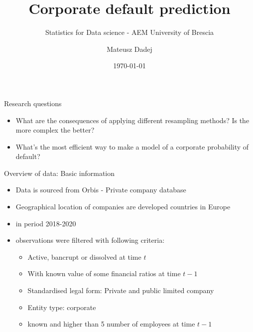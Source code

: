 \documentclass{beamer}
\title{Corporate default prediction}
\subtitle{Statistics for Data science - AEM University of Brescia}
\author{Mateusz Dadej}
\date{\today}
\begin{document}
\begin{frame}
\titlepage
\end{frame}

\begin{frame}{Research questions}
\begin{itemize}
\item What are the consequences of applying different resampling methods? Is the more complex the better?
\item What's the most efficient way to make a model of a corporate probability of default?
\end{itemize}
\end{frame}

\begin{frame}{Overview of data: Basic information}

\begin{itemize}
\item Data is sourced from Orbis - Private company database
\item Geographical location of companies are developed countries in Europe 
\item in period 2018-2020
\item observations were filtered with following criteria:
	\begin{itemize}
	\item Active, bancrupt or dissolved at time $t$
	\item With known value of some financial ratios at time $t-1$
	\item Standardised legal form: Private and public limited company
	\item Entity type: corporate
	\item known and higher than 5 number of employees at time $t-1$
	\end{itemize}

\end{itemize}

\end{frame}
\end{document}
